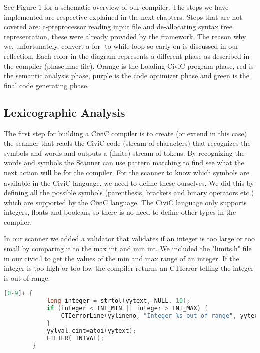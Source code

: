 \documentclass[hidelinks]{uva-inf-article}
\begin{document}
\par See Figure 1 for a schematic overview of our compiler. The steps we have implemented are respective explained in the next chapters. 
Steps that are not covered are: c-preprocessor reading input file and de-allocating syntax tree representation, 
these were already provided by the framework. 
The reason why we, unfortunately, convert a for- to while-loop so early on is discussed in our reflection.
Each color in the diagram represents a different phase as described in the compiler (phase.mac file). 
Orange is the Loading CiviC program phase, red is the semantic analysis phase, 
purple is the code optimizer phase and green is the final code generating phase.

\newpage
\subsection{Lexicographic Analysis}
The first step for building a CiviC compiler is to create (or extend in this case) 
the scanner that reads the CiviC code (stream of characters) that recognizes the 
symbols and words and outputs a (finite) stream of tokens.
By recognizing the words and symbols the Scanner can use pattern matching to find see
what the next action will be for the compiler. For the scanner to know which symbols
are available in the CiviC language, we need to define these ourselves. We did this 
by defining all the possible symbols (parenthesis, brackets and binary operators etc.)
which are supported by the CiviC language. The CiviC language only supports integers,
floats and booleans so there is no need to define other types in the compiler.

In our scanner we added a validator that validates if an integer is too large or too small by 
comparing it to the max int and min int. We included the "limits.h" file in our civic.l
to get the values of the min and max range of an integer. If the integer is too high or too low the compiler
returns an CTIerror telling the integer is out of range.

\begin{lstlisting}[basicstyle=\small, language=C, label=lst:code-1, caption=Integer range check, captionpos=b]
[0-9]+ { 
            long integer = strtol(yytext, NULL, 10);
            if (integer < INT_MIN || integer > INT_MAX) {
                CTIerrorLine(yylineno, "Integer %s out of range", yytext);
            }
            yylval.cint=atoi(yytext);
            FILTER( INTVAL);
        }
\end{lstlisting}
\end{document}
